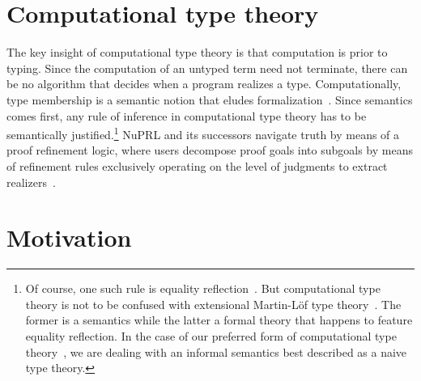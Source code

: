 \documentclass[a4paper]{article}
\begin{document}
\section{Computational type theory}

The key insight of computational type theory is that computation is prior to typing. Since the computation of an untyped term need not terminate, there can be no algorithm that decides when a program realizes a type. Computationally, type membership is a semantic notion that eludes formalization~\cite{angiuli2017chdtt,bentzen2026book}. Since semantics comes first, any rule of inference in computational type theory has to be semantically justified.\footnote{
	Of course, one such rule is equality reflection~\cite{dybjer2012program,sterling2015typetheory,bentzen2026book}. But computational type theory is not to be confused with extensional Martin-L\"of type theory~\cite{martinlof1982constructive}. The former is a semantics while the latter a formal theory that happens to feature equality reflection. In the case of our preferred form of computational type theory~\cite{bentzen2026book}, we are dealing with an informal semantics best described as a naive type theory.} 
NuPRL and its successors navigate truth by means of a proof refinement logic, where users decompose proof goals into subgoals by means of refinement rules exclusively operating on the level of judgments to extract realizers~\cite[\S3]{angiuli2018redprl}. 

\section{Motivation} \label{sec:motivation}
\end{document}
